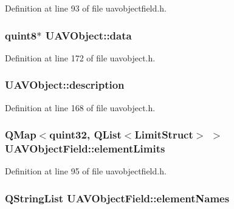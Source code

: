 Definition at line 93 of file uavobjectfield.\-h.

\hypertarget{group___u_a_v_objects_plugin_gadb2f4800bd3b6fb89c0f7c9fb67e49ff}{
\subsubsection[{data}]{\setlength{\rightskip}{0pt plus 5cm}quint8$\ast$ U\-A\-V\-Object\-::data\hspace{0.3cm}{\ttfamily [protected]}}}\label{group___u_a_v_objects_plugin_gadb2f4800bd3b6fb89c0f7c9fb67e49ff}


Definition at line 172 of file uavobject.\-h.

\hypertarget{group___u_a_v_objects_plugin_gaeeb0e865791ad6b21d83ef571d1ce48b}{
\subsubsection[{description}]{ U\-A\-V\-Object\-::description\hspace{0.3cm}{\ttfamily [protected]}}}\label{group___u_a_v_objects_plugin_gaeeb0e865791ad6b21d83ef571d1ce48b}


Definition at line 168 of file uavobject.\-h.

\hypertarget{group___u_a_v_objects_plugin_ga16abb7c1b891411815fe34473448b9ce}{
\subsubsection[{element\-Limits}]{\setlength{\rightskip}{0pt plus 5cm}Q\-Map$<$quint32, {\bf Q\-List}$<$Limit\-Struct$>$ $>$ U\-A\-V\-Object\-Field\-::element\-Limits\hspace{0.3cm}{\ttfamily [protected]}}}\label{group___u_a_v_objects_plugin_ga16abb7c1b891411815fe34473448b9ce}


Definition at line 95 of file uavobjectfield.\-h.

\hypertarget{group___u_a_v_objects_plugin_ga5849334da3325c4cac8625bb5910d57d}{
\subsubsection[{element\-Names}]{\setlength{\rightskip}{0pt plus 5cm}Q\-String\-List U\-A\-V\-Object\-Field\-::element\-Names\hspace{0.3cm}{\ttfamily [protected]}}}\label{group___u_a_v_objects_plugin_ga5849334da3325c4cac8625bb5910d57d}


